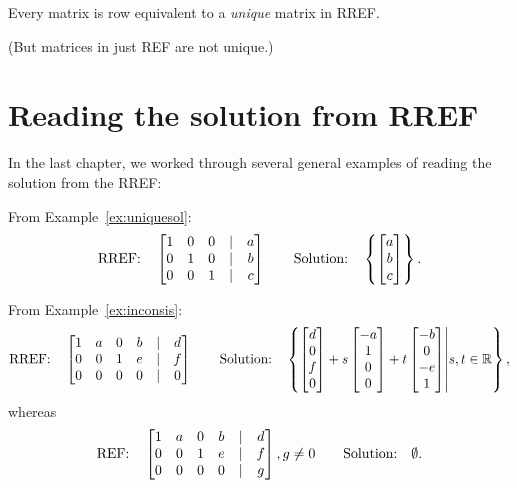 \begin{theorem} 

Every matrix is row equivalent to a
\emph{unique} matrix in RREF.  
\end{theorem}

(But matrices in just REF are not unique.)

\section{Reading the solution from RREF}

In the last chapter, we worked through several general examples of reading the solution from the RREF:

\begin{myexample} From Example~\ref{ex:uniquesol}:
$$\text{RREF:} \quad 
\left[ \begin{matrix} 1 & 0 & 0 &|& a\\
0 & 1 & 0 & | & b\\
0 & 0 & 1 & | & c \end{matrix} \right] \qquad
\text{Solution:} \quad \left\{\left[ \begin{matrix} a\\b\\c \end{matrix} \right]\right\}.
$$
\end{myexample}

\begin{myexample}  From Example~\ref{ex:inconsis}:
$$
\text{RREF:} \quad \left[ \begin{matrix} 1 & a & 0 & b & | & d\\
0 & 0 & 1 & e &|& f\\
0 & 0 & 0 & 0 &|& 0
 \end{matrix} \right]\qquad
\text{Solution:} \quad \left\{ \left[ \begin{matrix} d\\0\\f\\0 \end{matrix} \right] + s\left[ \begin{matrix} -a\\1\\0\\0 \end{matrix} \right] + t\left[ \begin{matrix} -b\\0\\-e\\1 \end{matrix} \right] \middle| s,t\in \mathbb{R}\right\},
$$
whereas
$$
\text{REF:} \quad \left[ \begin{matrix} 1 & a & 0 & b & | & d\\
0 & 0 & 1 & e &|& f\\
0 & 0 & 0 & 0 &|& g
 \end{matrix} \right], g \neq 0 \qquad
\text{Solution:} \quad \emptyset.
$$
%
%
\end{myexample}

